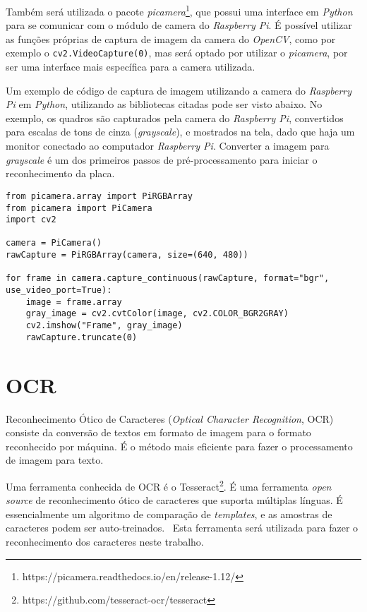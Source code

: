 Também será utilizada o pacote \emph{picamera}\footnote{https://picamera.readthedocs.io/en/release-1.12/},
que possui uma interface em \emph{Python} para se comunicar com o módulo de camera do \emph{Raspberry Pi}.
É possível utilizar as funções próprias de captura de imagem da camera do \emph{OpenCV}, como por exemplo
o \texttt{cv2.VideoCapture(0)}, mas será optado por utilizar o \emph{picamera}, por ser uma interface mais
específica para a camera utilizada.

Um exemplo de código de captura de imagem utilizando a camera do \emph{Raspberry Pi} em \emph{Python}, utilizando
as bibliotecas citadas pode ser visto abaixo. No exemplo, os quadros são capturados pela camera do \emph{Raspberry Pi},
convertidos para escalas de tons de cinza (\emph{grayscale}), e mostrados na tela, dado que haja um monitor conectado ao
computador \emph{Raspberry Pi}. Converter a imagem para \emph{grayscale} é um dos primeiros passos de pré-processamento
para iniciar o reconhecimento da placa.

\begin{lstlisting}
from picamera.array import PiRGBArray
from picamera import PiCamera
import cv2

camera = PiCamera()
rawCapture = PiRGBArray(camera, size=(640, 480))

for frame in camera.capture_continuous(rawCapture, format="bgr", use_video_port=True):
	image = frame.array
	gray_image = cv2.cvtColor(image, cv2.COLOR_BGR2GRAY)
	cv2.imshow("Frame", gray_image)
	rawCapture.truncate(0)
\end{lstlisting}


\section{OCR}
\label{sec:ocr}

Reconhecimento Ótico de Caracteres (\emph{Optical Character Recognition}, OCR)
consiste da conversão de textos em formato de imagem para o formato reconhecido
por máquina. É o método mais eficiente para fazer o processamento de imagem para
texto.~\cite{mohit2015designing}

Uma ferramenta conhecida de OCR é o
Tesseract\footnote{https://github.com/tesseract-ocr/tesseract}. É uma ferramenta
\emph{open source} de reconhecimento ótico de caracteres que suporta múltiplas
línguas.  É essencialmente um algoritmo de comparação de \emph{templates}, e as
amostras de caracteres podem ser auto-treinados.~\cite{ho2016intelligent} Esta
ferramenta será utilizada para fazer o reconhecimento dos caracteres neste trabalho.

